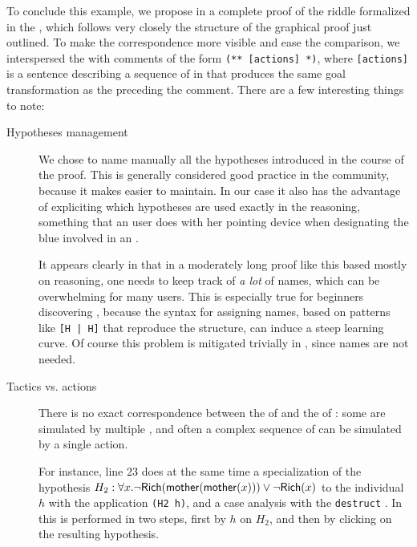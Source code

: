 To conclude this example, we propose in  a complete proof of
the riddle formalized in the  , which follows very closely the
structure of the graphical proof just outlined. To make the correspondence more
visible and ease the comparison, we interspersed the  with comments
of the form \texttt{(** [actions] *)}, where \texttt{[actions]} is a
sentence describing a sequence of  in  that produces the same goal
transformation as the  preceding the comment. There are a few interesting
things to note:
\begin{description}
  \item[Hypotheses management] We chose to name manually all the hypotheses
  introduced in the course of the proof. This is generally considered good
  practice in the  community, because it makes  easier
  to maintain. In our case it also has the advantage of expliciting which
  hypotheses are used exactly in the reasoning, something that an 
  user does with her pointing device when designating the blue 
  involved in an .
  
  It appears clearly in  that in a moderately long proof
  like this based mostly on  reasoning, one needs to keep track of
  \emph{a lot} of names, which can be overwhelming for many users. This is
  especially true for beginners discovering , because the syntax for
  assigning names, based on patterns like \texttt{[H | H]} that reproduce the
   structure, can induce a steep learning curve. Of course this
  problem is mitigated trivially in , since names are not needed.

  \item[Tactics vs. actions] There is no exact correspondence between the
   of  and the  of : some  are
  simulated by multiple , and often a complex sequence of 
  can be simulated by a single action.
  
  For instance, line 23 does at the same time a specialization of the hypothesis
  $H_2 : \forall x. \neg \mbox{\textsf{Rich}}(\mbox{\textsf{mother}}(\mbox{\textsf{mother}}(x))) \lor \neg \mbox{\textsf{Rich}}(x)$ to the
  individual $h$ with the application \texttt{(H2 h)}, and a case analysis with
  the \texttt{destruct} . In  this is performed in two
  steps, first by  $h$ on $H_2$, and then
  by clicking on the resulting hypothesis.


\end{description}
